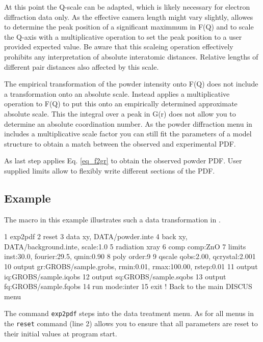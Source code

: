At this point the Q-scale can be adapted, which is likely necessary for 
electron diffraction data only. As the effective camera length might vary
slightly, \Discus allowes to determine the peak position of a significant 
maximmum in F(Q) and to scale the Q-axis with a multiplicative operation 
to set the peak position to a user provided expected value. Be aware that
this scaleing operation effectively prohibits any interpretation of 
absolute interatomic distances. Relative lengths of different pair distances
also affected by this scale.

The empirical transformation of the powder intensity onto F(Q) does not
include a transformation onto an absolute scale. Instead \Discus applies a
multiplicative operation to F(Q) to put this onto an empirically determined 
approximate absolute scale. This the integral over a peak in G(r) does not
allow you to determine an absolute coordination number. As the powder 
diffraction menu in \Discus includes a multiplicative scale factor you can
still fit the parameters of a model structure to obtain a match between 
the observed and experimental PDF.

As last step \Discus applies Eq. \ref{eq_f2gr} to obtain the observed
powder PDF. User supplied limits allow to flexibly write different 
sections of the PDF.

\subsection{Example \label{data-pdf-exa1}}

The macro in this example illustrates such a data transformation in \discus.

\begin{MacVerbatim}
 1 exp2pdf
 2 reset
 3 data xy, DATA/powder.inte
 4 back xy, DATA/background.inte, scale:1.0
 5 radiation xray
 6 comp comp:ZnO
 7 limits inst:30.0, fourier:29.5, qmin:0.90
 8 poly order:9
 9 qscale qobs:2.00, qcrystal:2.001
10 output gr:GROBS/sample.grobs, rmin:0.01, rmax:100.00, rstep:0.01
11 output iq:GROBS/sample.iqobs
12 output sq:GROBS/sample.sqobs
13 output fq:GROBS/sample.fqobs
14 run mode:inter
15 exit  ! Back to the main DISCUS menu
\end{MacVerbatim}

The \Discus command {\tt exp2pdf} steps into the data treatment menu.
As for all menus in \Discus the {\tt reset} command (line 2) allows you to ensure that all 
parameters are reset to their initial values at program start.

